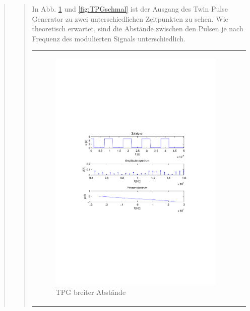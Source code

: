 \begin{quote}
\begin{quote}
        In Abb. \ref{fig:TPGbreit} und \ref{fig:TPGschmal} ist der Ausgang des
        Twin Pulse Generator zu zwei unterschiedlichen Zeitpunkten zu sehen. Wie
        theoretisch erwartet, sind die Abstände zwischen den Pulsen je nach
        Frequenz des modulierten Signals unterschiedlich. 
        
         \begin{center}
            \begin{tabular}{ll}
            
            \hspace{-5cm}
                \begin{minipage}{0.67\textwidth}
                    \begin{figure}[H]
                        \includegraphics[scale=0.7, trim = 35mm 100mm 35mm 95mm, clip]{Bilder/f1TwPu_breit}
                        \caption{TPG breiter Abstände}
                         \label{fig:TPGbreit}
                    \end{figure}
                \end{minipage}
                

\end{tabular}
\end{center}
\end{quote}
\end{quote}

